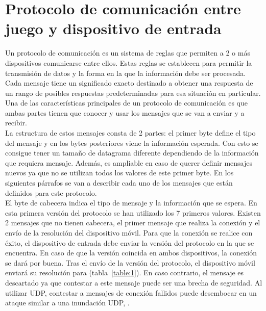 \section{Protocolo de comunicaci\'on entre juego y dispositivo de entrada}

Un protocolo de comunicaci\'on es un sistema de reglas que permiten a 2 o m\'as dispositivos comunicarse entre ellos. Estas reglas se establecen para permitir la transmisi\'on de datos y la forma en la que la informaci\'on debe ser procesada. Cada mensaje tiene un significado exacto destinado a obtener una respuesta de un rango de posibles respuestas predeterminadas para esa situaci\'on en particular. Una de las caracter\'isticas principales de un protocolo de comunicaci\'on es que ambas partes tienen que conocer y usar los mensajes que se van a enviar y a recibir. \\

La estructura de estos mensajes consta de 2 partes: el primer byte define el tipo del mensaje y en los bytes posteriores viene la informaci\'on esperada. Con esto se consigue tener un tama\~no de datagrama diferente dependiendo de la informaci\'on que requiera mensaje. Adem\'as, es ampliable en caso de querer definir mensajes nuevos ya que no se utilizan todos los valores de este primer byte. En los siguientes p\'arrafos se van a describir cada uno de los mensajes que est\'an definidos para este protocolo. \\

El byte de cabecera indica el tipo de mensaje y la informaci\'on que se espera. En esta primera versi\'on del protocolo se han utilizado los 7 primeros valores. Existen 2 mensajes que no tienen cabecera, el primer mensaje que realiza la conexi\'on y el env\'io de la resoluci\'on del dispositivo m\'ovil. Para que la conexi\'on se realice con \'exito, el dispositivo de entrada debe enviar la versi\'on del protocolo en la que se encuentra. En caso de que la versi\'on coincida en ambos dispositivos, la conexi\'on se dar\'a por buena. Tras el env\'io de la versi\'on del protocolo, el dispositivo m\'ovil enviar\'a su resoluci\'on para (tabla~\ref{table:1}). En caso contrario, el mensaje es descartado ya que contestar a este mensaje puede ser una brecha de seguridad. Al utilizar UDP, contestar a mensajes de conexi\'on fallidos puede desembocar en un ataque similar a una inundaci\'on UDP, \cite{udpflood}.\\


